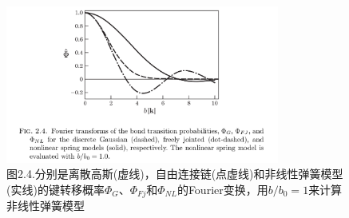 \begin{figure}[ht]
\centering
\includegraphics[width=9cm]{./figures/24.png}
\caption{图2.4.分别是离散高斯(虚线)，自由连接链(点虚线)和非线性弹簧模型(实线)的键转移概率$\varPhi_{G}$、$\varPhi_{Fj}$和$\varPhi_{NL}$的Fourier变换，用$b/b_{0}=1$来计算非线性弹簧模型}
\end{figure}
%
